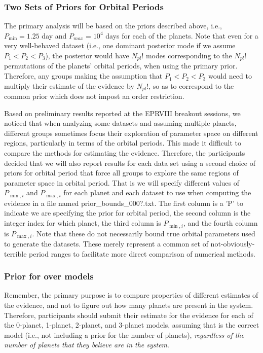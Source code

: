 \documentclass{article}
\begin{document}
\subsubsection{Two Sets of Priors for Orbital Periods}
\label{secAltPriorPeriods}
%
The primary analysis will be based on the priors described above, i.e., $P_{\min}=1.25$ day and $P_{max}=10^4$ days for each of the planets.  Note that even for a very well-behaved dataset (i.e., one dominant posterior mode if we assume $P_1<P_2<P_3$), the posterior would have $N_{pl}!$ modes corresponding to the $N_{pl}!$ permutations of the planets' orbital periods, when using the primary prior.  Therefore, any groups making the assumption that $P_1<P_2<P_3$ would need to multiply their estimate of the evidence by $N_{pl}!$, so as to correspond to the common prior which does not impost an order restriction.  

Based on preliminary results reported at the EPRVIII breakout sessions, we noticed that when analyzing some datasets and assuming multiple planets, different groups sometimes focus their exploration of parameter space on different regions, particularly in terms of the orbital periods.  This made it difficult to compare the methods for estimating the evidence.  Therefore, the participants decided that we will also report results for each data set using a second choice of priors for orbital period that force all groups to explore the same regions of parameter space in orbital period.  That is we will specify different values of $P_{\min,i}$ and $P_{\max,i}$ for each planet and each dataset to use when computing the evidence in a file named prior\_bounds\_000?.txt.  The first column is a 'P' to indicate we are specifying the prior for orbital period, the second column is the integer index for which planet, the third column is $P_{\min,i}$, and the fourth column is $P_{\max,i}$.  Note that these do not necessarily bound true orbital parameters used to generate the datasets.  These merely represent a common set of not-obviously-terrible period ranges to facilitate more direct comparison of numerical methods.  

\subsubsection{Prior for over models}
Remember, the primary purpose is to compare properties of different estimates of the evidence, and not to figure out how many planets are present in the system.  
Therefore, participants should submit their estimate for the evidence for each of the 0-planet, 1-planet, 2-planet, and 3-planet models, assuming that is the correct model (i.e., not including a prior for the number of planets), {\em regardless of the number of planets that they believe are in the system}.  
\end{document}
